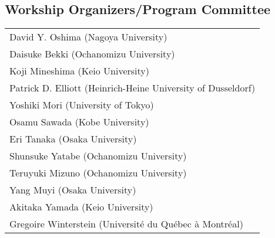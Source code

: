 \documentclass[12pt]{jarticle}
\begin{document}
\subsection*{Workship Organizers/Program Committee}
\begin{flushleft}
\begin{tabular}{l}
David Y. Oshima (Nagoya University) \\
Daisuke Bekki (Ochanomizu University) \\
Koji Mineshima (Keio University) \\
Patrick D. Elliott (Heinrich-Heine University of Dusseldorf) \\
Yoshiki Mori (University of Tokyo) \\
Osamu Sawada (Kobe University) \\
Eri Tanaka (Osaka University) \\
Shunsuke Yatabe (Ochanomizu University) \\
Teruyuki Mizuno (Ochanomizu University) \\
Yang Muyi (Osaka University) \\
Akitaka Yamada (Keio University) \\
Gregoire Winterstein (Université du Québec à Montréal) \\

\end{tabular}
\end{flushleft}
\newpage
  
  
\end{document}
